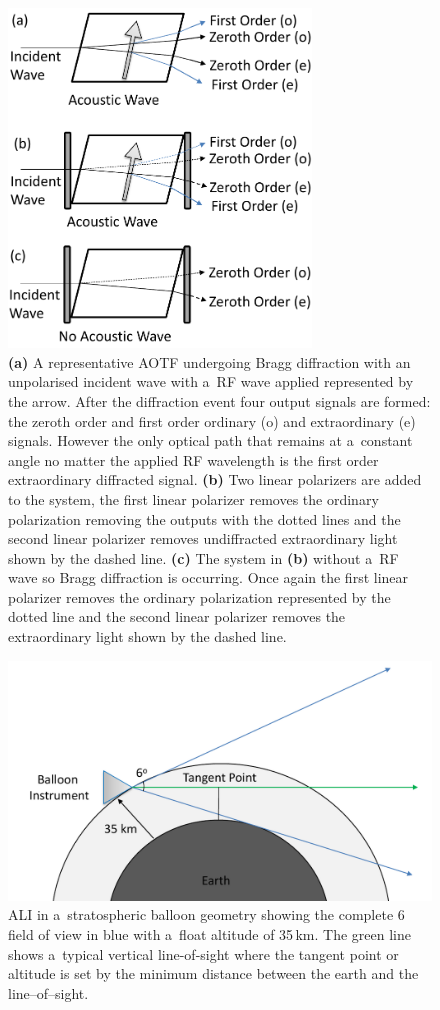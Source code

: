 \documentclass[amtd, online, hvmath]{copernicus}
\begin{document}
\begin{figure}
\includegraphics[height=90mm]{amt-2015-329-discussions-f02.pdf}
\caption{\textbf{(a)} A representative AOTF undergoing Bragg diffraction with an
  unpolarised incident wave with a~RF wave applied represented by the
  arrow. After the diffraction event four output signals are formed:
  the zeroth order and first order ordinary (o) and extraordinary (e)
  signals. However the only optical path that remains at a~constant
  angle no matter the applied RF wavelength is the first order
  extraordinary diffracted signal. \textbf{(b)} Two linear polarizers
  are added to the system, the first linear polarizer removes the
  ordinary polarization removing the outputs with the dotted lines and
  the second linear polarizer removes undiffracted extraordinary light
  shown by the dashed line. \textbf{(c)} The system in \textbf{(b)}
  without a~RF wave so Bragg diffraction is occurring. Once again the
  first linear polarizer removes the ordinary polarization represented
  by the dotted line and the second linear polarizer removes the
  extraordinary light shown by the dashed line.}
\label{amtd-2015-0329-f02.pdf}
\end{figure}

\begin{figure}
\includegraphics[width=120mm]{amt-2015-329-discussions-f03.pdf}
\caption{ALI in a~stratospheric balloon geometry showing the complete
  6{\degree} field of view in blue with a~float altitude of
  35\,\unit{km}. The green line shows a~typical vertical line-of-sight
  where the tangent point or altitude is set by the minimum distance
  between the earth and the line--of--sight.}
\label{amtd-2015-0329-f03.pdf}
\end{figure}
\end{document}
